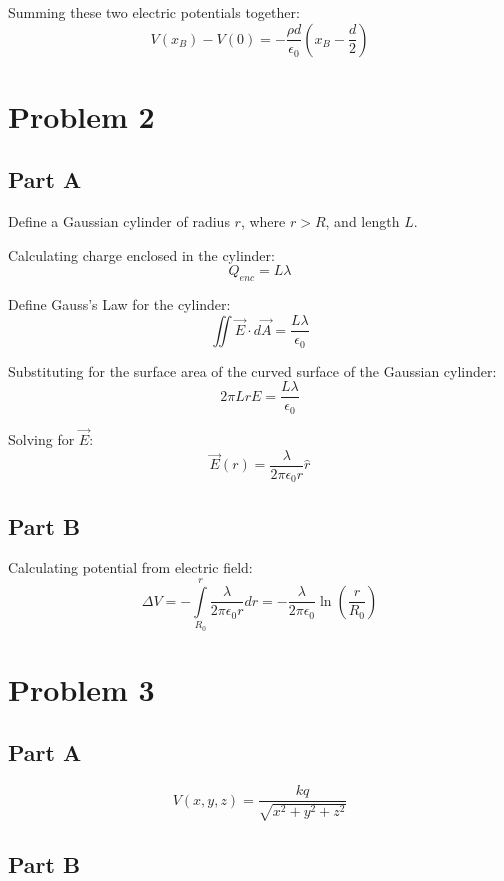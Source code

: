 \documentclass{article}
\begin{document}
Summing these two electric potentials together:
$$ V(x_{B}) - V(0) = -\frac{\rho d}{ \epsilon_{0} }\left( x_{B} - \frac{ d }{ 2 } \right) $$

\section*{Problem 2}

\subsection*{Part A}

Define a Gaussian cylinder of radius $r$, where $r > R$, and length $L$.

\bigbreak

Calculating charge enclosed in the cylinder:
$$ Q_{enc} = L \lambda $$

Define Gauss's Law for the cylinder:
$$ \iint \vec{E} \cdot d\vec{A} = \frac{ L \lambda }{ \epsilon_{0} } $$

Substituting for the surface area of the curved surface of the Gaussian
cylinder:
$$ 2 \pi L r E = \frac{ L \lambda }{ \epsilon_0 } $$

Solving for $\vec{E}$:
$$ \vec{E}(r) = \frac{ \lambda }{ 2 \pi \epsilon_{0} r } \hat{r} $$

\subsection*{Part B}

Calculating potential from electric field:
$$ \Delta V = - \int\limits_{R_{0}}^{r} \frac{ \lambda }{ 2 \pi \epsilon_{0} r }
dr = -\frac{ \lambda }{ 2 \pi \epsilon_{0} } \ln\left( \frac{ r }{ R_{0} } \right)$$

\section*{Problem 3}

\subsection*{Part A}

$$ V(x, y, z) = \frac{ kq }{ \sqrt{x^{2} + y^{2} + z^{2}} } $$

\subsection*{Part B}
\end{document}
